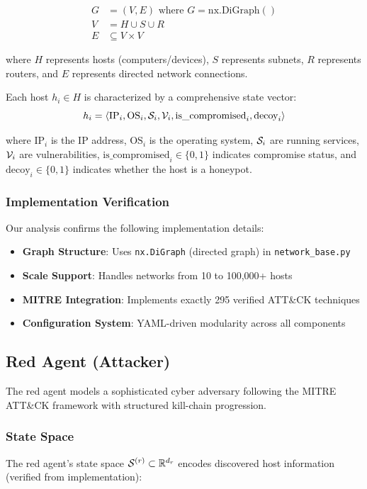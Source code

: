 \documentclass[11pt]{article}
\theoremstyle{definition}
\theoremstyle{plain}
\begin{document}
\begin{align}
G &= (V, E) \text{ where } G = \text{nx.DiGraph}() \\
V &= H \cup S \cup R \\
E &\subseteq V \times V
\end{align}

where $H$ represents hosts (computers/devices), $S$ represents subnets, $R$ represents routers, and $E$ represents directed network connections.

Each host $h_i \in H$ is characterized by a comprehensive state vector:
\begin{equation}
h_i = \langle \text{IP}_i, \text{OS}_i, \mathcal{S}_i, \mathcal{V}_i, \text{is\_compromised}_i, \text{decoy}_i \rangle
\end{equation}

where $\text{IP}_i$ is the IP address, $\text{OS}_i$ is the operating system, $\mathcal{S}_i$ are running services, $\mathcal{V}_i$ are vulnerabilities, $\text{is\_compromised}_i \in \{0,1\}$ indicates compromise status, and $\text{decoy}_i \in \{0,1\}$ indicates whether the host is a honeypot.

\subsubsection{Implementation Verification}
Our analysis confirms the following implementation details:
\begin{itemize}
    \item \textbf{Graph Structure}: Uses \texttt{nx.DiGraph} (directed graph) in \texttt{network\_base.py}
    \item \textbf{Scale Support}: Handles networks from 10 to 100,000+ hosts
    \item \textbf{MITRE Integration}: Implements exactly 295 verified ATT\&CK techniques
    \item \textbf{Configuration System}: YAML-driven modularity across all components
\end{itemize}

\subsection{Red Agent (Attacker)}

The red agent models a sophisticated cyber adversary following the MITRE ATT\&CK framework with structured kill-chain progression.

\subsubsection{State Space}
The red agent's state space $\mathcal{S}^{(r)} \subset \mathbb{R}^{d_r}$ encodes discovered host information (verified from implementation):
\end{document}
